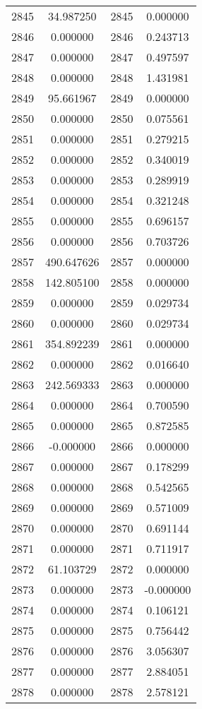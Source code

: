 \documentclass[12pt]{article}
\begin{document}
\begin{longtable}{@{}cccc@{}}
2845 & 34.987250 & 2845 & 0.000000 \\
2846 & 0.000000 & 2846 & 0.243713 \\
2847 & 0.000000 & 2847 & 0.497597 \\
2848 & 0.000000 & 2848 & 1.431981 \\
2849 & 95.661967 & 2849 & 0.000000 \\
2850 & 0.000000 & 2850 & 0.075561 \\
2851 & 0.000000 & 2851 & 0.279215 \\
2852 & 0.000000 & 2852 & 0.340019 \\
2853 & 0.000000 & 2853 & 0.289919 \\
2854 & 0.000000 & 2854 & 0.321248 \\
2855 & 0.000000 & 2855 & 0.696157 \\
2856 & 0.000000 & 2856 & 0.703726 \\
2857 & 490.647626 & 2857 & 0.000000 \\
2858 & 142.805100 & 2858 & 0.000000 \\
2859 & 0.000000 & 2859 & 0.029734 \\
2860 & 0.000000 & 2860 & 0.029734 \\
2861 & 354.892239 & 2861 & 0.000000 \\
2862 & 0.000000 & 2862 & 0.016640 \\
2863 & 242.569333 & 2863 & 0.000000 \\
2864 & 0.000000 & 2864 & 0.700590 \\
2865 & 0.000000 & 2865 & 0.872585 \\
2866 & -0.000000 & 2866 & 0.000000 \\
2867 & 0.000000 & 2867 & 0.178299 \\
2868 & 0.000000 & 2868 & 0.542565 \\
2869 & 0.000000 & 2869 & 0.571009 \\
2870 & 0.000000 & 2870 & 0.691144 \\
2871 & 0.000000 & 2871 & 0.711917 \\
2872 & 61.103729 & 2872 & 0.000000 \\
2873 & 0.000000 & 2873 & -0.000000 \\
2874 & 0.000000 & 2874 & 0.106121 \\
2875 & 0.000000 & 2875 & 0.756442 \\
2876 & 0.000000 & 2876 & 3.056307 \\
2877 & 0.000000 & 2877 & 2.884051 \\
2878 & 0.000000 & 2878 & 2.578121 \\

\end{longtable}
\end{document}
